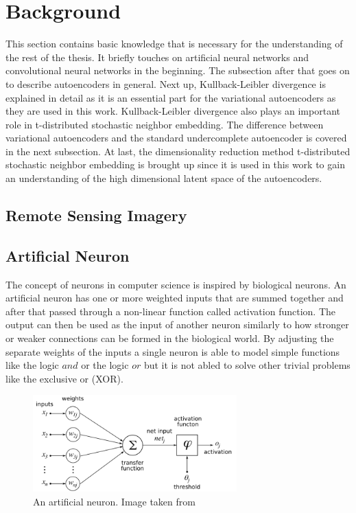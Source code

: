 \section{Background}

This section contains basic knowledge that is necessary for the understanding of the rest of the thesis.
It briefly touches on artificial neural networks and convolutional neural networks in the beginning.
The subsection after that goes on to describe autoencoders in general. Next up, Kullback-Leibler divergence
is explained in detail as it is an essential part for the variational autoencoders as they are used in this
work. Kullback-Leibler divergence also plays an important role in t-distributed stochastic neighbor embedding.
The difference between variational autoencoders and the standard undercomplete autoencoder is covered in the 
next subsection. At last, the dimensionality reduction method 
t-distributed stochastic neighbor embedding is brought up since it is used in this work to gain an 
understanding of the high dimensional latent space of the autoencoders.

\subsection{Remote Sensing Imagery}


\subsection{Artificial Neuron}

The concept of neurons in computer science is inspired by biological neurons. An artificial neuron has one or
more weighted inputs that are summed together
and after that passed through a non-linear function called activation function. The output can then be used as
the input of another neuron similarly to how stronger or weaker connections can be formed in the biological
world.
By adjusting the separate weights of the inputs a single neuron is able to model
simple functions like the logic $and$ or the logic $or$ but it is not abled to solve other trivial problems
like the exclusive or (XOR).

\begin{figure}[h]
    \centering
    \includegraphics[width=0.7\textwidth]{images/figures/artificial_neuronHOML.png}
    \caption{An artificial neuron. Image taken from \parencite{2005-chrislb-artificial-neuron}}
\end{figure}


